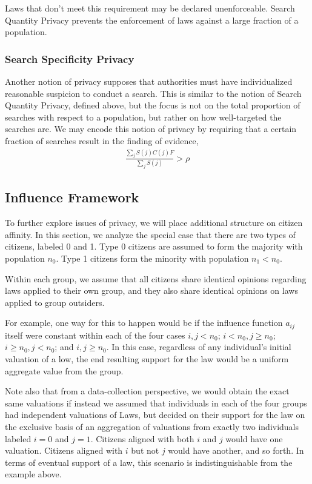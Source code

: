 Laws that don't meet this requirement may be declared unenforceable.  Search Quantity Privacy prevents the enforcement of laws against a large fraction of a population.


\subsubsection{Search Specificity Privacy}

Another notion of privacy supposes that authorities must have individualized reasonable suspicion to conduct a search.  This is similar to the notion of Search Quantity Privacy, defined above, but the focus is not on the total proportion of searches with respect to a population, but rather on how well-targeted the searches are.  We may encode this notion of privacy by requiring that a certain fraction of searches result in the finding of evidence,
\begin{align}
\frac{\sum_j S(j)C(j)F}{\sum_j S(j)} > \rho
\end{align}



\subsection{Influence Framework}

To further explore issues of privacy, we will place additional structure on citizen affinity.  In this section, we analyze the special case that there are two types of citizens, labeled 0 and 1.  Type 0 citizens are assumed to form the majority with population $n_0$.  Type 1 citizens form the minority with population $n_1 < n_0$.  

Within each group, we assume that all citizens share identical opinions regarding laws applied to their own group, and they also share identical opinions on laws applied to group outsiders. 

For example, one way for this to happen would be if the influence function $a_{ij}$ itself were constant within each of the four cases $i,j<n_0$; $i<n_0,j\geq n_0$; $i\geq n_0,j < n_0$; and $i,j\geq n_0$. In this case, regardless of any individual's initial valuation of a low, the end resulting support for the law would be a uniform  aggregate value from the group.  

Note also that from a data-collection perspective, we would obtain the exact same valuations if instead we assumed that individuals in each of the four groups had independent valuations of Laws, but decided on their support for the law on the exclusive basis of an aggregation of valuations from exactly two individuals labeled $i=0$ and $j=1$.  Citizens aligned with both $i$ and $j$ would have one valuation.  Citizens aligned with $i$ but not $j$ would have another, and so forth.  In terms of eventual support of a law, this scenario is indistinguishable from the example above.

